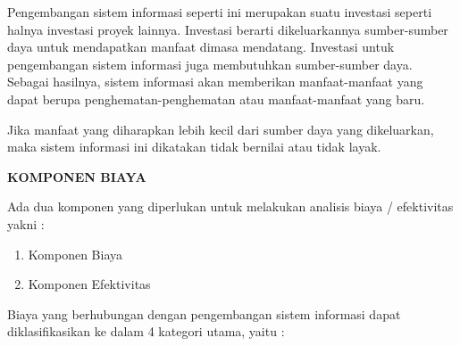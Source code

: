 \documentclass[pdftex,12pt, oneside]{article}
\begin{document}
Pengembangan sistem informasi seperti ini merupakan suatu investasi seperti halnya investasi proyek lainnya. Investasi berarti dikeluarkannya sumber-sumber daya untuk mendapatkan manfaat dimasa mendatang. Investasi untuk pengembangan sistem informasi juga membutuhkan sumber-sumber daya. Sebagai hasilnya, sistem informasi akan memberikan manfaat-manfaat yang dapat berupa penghematan-penghematan atau manfaat-manfaat yang baru.

Jika manfaat yang diharapkan lebih kecil dari sumber daya yang dikeluarkan, maka sistem informasi ini dikatakan tidak bernilai atau tidak layak.

\textbf{KOMPONEN BIAYA}

Ada dua komponen yang diperlukan untuk melakukan analisis biaya / efektivitas yakni :

\begin{enumerate}[1.]
  \item Komponen Biaya
  \item Komponen Efektivitas
\end{enumerate}

Biaya yang berhubungan dengan pengembangan sistem informasi dapat diklasifikasikan ke dalam 4 kategori utama, yaitu :
\end{document}
